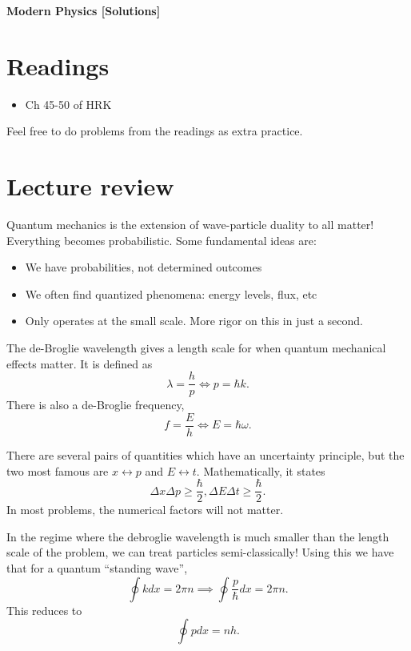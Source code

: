 \documentclass[11pt]{scrartcl}
\title{\titlee}
\author{Cambridge Physics Academy}
\date{2023-2024}
\newcommand{\titlee}{Modern Physics [Solutions]}
\begin{document}
\thispagestyle{empty}
\begin{center}
    
    
    \Huge \textbf{\textsf{\titlee}}

    \large \theauthor
\end{center}

\setcounter{section}{-1}
\section{Readings}
\begin{itemize}
    \item Ch 45-50 of HRK
\end{itemize}
Feel free to do problems from the readings as extra practice.


\section{Lecture review}

Quantum mechanics is the extension of wave-particle duality to all matter! Everything becomes probabilistic. Some fundamental ideas are:
\begin{itemize}
    \item We have probabilities, not determined outcomes
    \item We often find quantized phenomena: energy levels, flux, etc
    \item Only operates at the small scale. More rigor on this in just a second.
\end{itemize}

\begin{defn}
    The de-Broglie wavelength gives a length scale for when quantum mechanical effects matter. It is defined as
    $$\lambda = \frac hp \iff p = \hbar k.$$
    There is also a de-Broglie frequency,
    $$f = \frac Eh \iff E = \hbar \omega.$$
\end{defn}


\begin{theorem}
    There are several pairs of quantities which have an uncertainty principle, but the two most famous are $x \leftrightarrow p$ and $E \leftrightarrow t$. Mathematically, it states
    $$\Delta x \Delta p \ge \frac{\hbar} 2, \Delta E \Delta t \ge \frac \hbar 2.$$
    In most problems, the numerical factors will not matter.
\end{theorem}

\begin{idea}
    In the regime where the debroglie wavelength is much smaller than the length scale of the problem, we can treat particles semi-classically! Using this we have that for a quantum ``standing wave'',
    $$\oint k dx = 2\pi n \implies \oint \frac{p}{\hbar} dx = 2\pi n.$$
    This reduces to
    $$\oint p dx = nh.$$
\end{idea}
\end{document}
